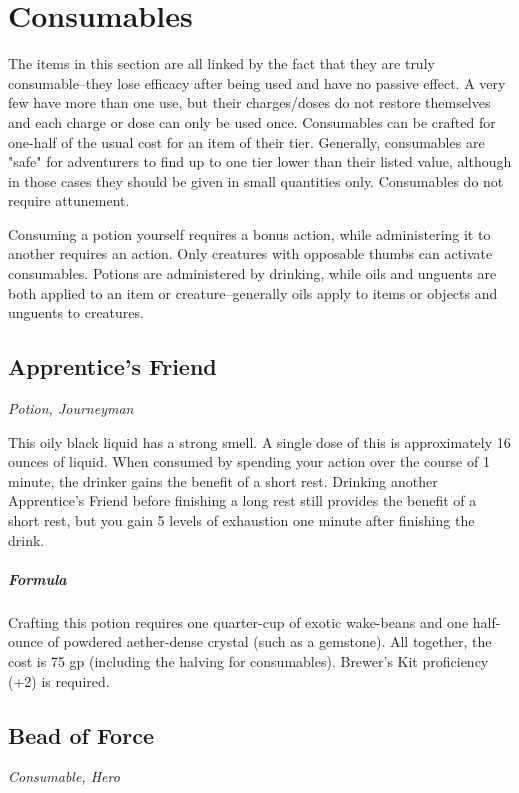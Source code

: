 \section{Consumables}\label{mi:potions-oils-and-scrolls}
The items in this section are all linked by the fact that they are truly consumable--they lose efficacy after being used and have no passive effect. A very few have more than one use, but their charges/doses do not restore themselves and each charge or dose can only be used once. Consumables can be crafted for one-half of the usual cost for an item of their tier. Generally, consumables are "safe" for adventurers to find up to one tier lower than their listed value, although in those cases they should be given in small quantities only. Consumables do not require attunement.

Consuming a potion yourself requires a bonus action, while administering it to another requires an action. Only creatures with opposable thumbs can activate consumables. Potions are administered by drinking, while oils and unguents are both applied to an item or creature--generally oils apply to items or objects and unguents to creatures.

\subsection{Apprentice's Friend}
\textit{Potion, Journeyman}

This oily black liquid has a strong smell. A single dose of this is approximately 16 ounces of liquid. When consumed by spending your action over the course of 1 minute, the drinker gains the benefit of a short rest. Drinking another Apprentice's Friend before finishing a long rest still provides the benefit of a short rest, but you gain 5 levels of exhaustion one minute after finishing the drink.

\subparagraph*{Formula} Crafting this potion requires one quarter-cup of exotic wake-beans and one half-ounce of powdered aether-dense crystal (such as a gemstone). All together, the cost is 75 gp (including the halving for consumables). Brewer's Kit proficiency (+2) is required.

\subsection{Bead of Force}
\textit{Consumable, Hero}

